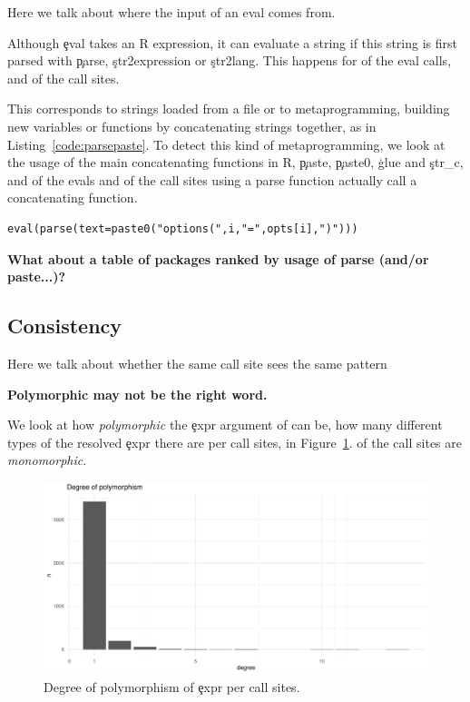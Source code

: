 \documentclass[conference]{IEEEtran}
\begin{document}
Here we talk about where the input of an eval comes from.

Although \c{eval} takes an R expression, it can evaluate a string if this string is first parsed with \c{parse}, \c{str2expression} or \c{str2lang}. This happens for \PercentParsedEvals of the eval calls, and \PercentParsedCallSites of the call sites.

This corresponds to strings loaded from a file or to metaprogramming, \ie building new variables or functions by concatenating strings together, as in Listing~\ref{code:parsepaste}. To detect this kind of metaprogramming, we look at the usage of the main concatenating functions in R, \c{paste}, \c{paste0}, \c{glue} and \c{str_c}, and \PasteParsedEvals of the evals and \PasteParsedCallSite of the call sites using a parse function actually call a concatenating function.


\begin{lstlisting}[caption={Using \c{eval} and \c{parse} to do meta-programming in package \emph{data.table}, to build the options at load time (in \emph{onLoad.R}).}, label=code:parsepaste]
eval(parse(text=paste0("options(",i,"=",opts[i],")")))
\end{lstlisting}

\textbf{What about a table of packages ranked by usage of parse (and/or paste...)?}


\subsection{Consistency}

Here we talk about whether the same call site sees the same pattern

{\bf Polymorphic may not be the right word.}

We look at how \emph{polymorphic} the \c{expr} argument of \eval can be, \ie
how many different types of the resolved \c{expr} there are per call sites,
in Figure~\ref{fig:polymorphism}. \PercentMonomorphic of the call sites are
\emph{monomorphic}.

\begin{figure}[!h]
    \includegraphics[width=\columnwidth]{polymorphism}
    \caption{Degree of polymorphism of \c{expr} per call sites.} \label{fig:polymorphism}
\end{figure}
\end{document}
